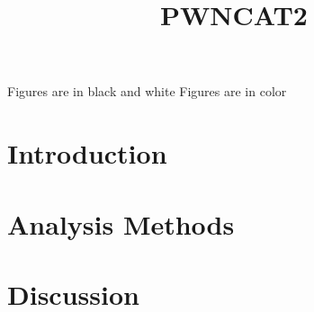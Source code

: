 \documentclass[12pt,preprint]{aastex}
\begin{document}
\title{PWNCAT2}


\ifdefined\bwfigures
  Figures are in black and white
\else
  Figures are in color
\fi





\begin{abstract}
  
\end{abstract}

\section{Introduction}



\section{Analysis Methods}


\section{Discussion}







\end{document}
